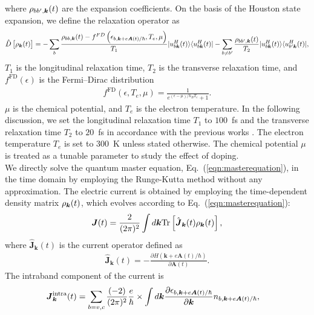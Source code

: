 where $\rho_{bb',\boldsymbol k}(t)$ are the expansion coefficients. On the basis of the Houston state expansion, we define the relaxation operator \cite{sato2019microscopic,PhysRevB.99.214302,sato2019light} as
\begin{align}
  \hat D\left [\rho_{\boldsymbol k}(t) \right ]=-\sum_{b}\frac{\rho_{bb,\boldsymbol k}(t)-f^{FD}\left (\epsilon_{b,\boldsymbol k+e\boldsymbol A(t)/\hbar},T_e,\mu \right)}{T_1}|u^H_{b\boldsymbol k}(t)\rangle \langle u^H_{b\boldsymbol k}(t)| 
  -\sum_{b\neq b'} \frac{\rho_{bb',\boldsymbol k}(t)}{T_2}|u^H_{b\boldsymbol k}(t)\rangle \langle u^H_{b'\boldsymbol k}(t)|,
\label{eqn:relaxation}
\end{align}
$T_1$ is the longitudinal relaxation time, $T_2$ is the transverse relaxation time, and $f^{\mathrm{FD}}(\epsilon)$ is the Fermi--Dirac distribution
\begin{align}
f^{\mathrm{FD}}(\epsilon, T_e, \mu)=\frac{1}{e^{(\epsilon-\mu)/k_BT_e}+1}.
\label{eq:fd-dist}
\end{align}
$\mu$ is the chemical potential, and $T_e$ is the electron temperature.
In the following discussion, we set the longitudinal relaxation time $T_1$ to $100$~fs and the transverse relaxation time $T_2$ to $20$~fs in accordance with the previous works \cite{sato2021nonlinear,sato2021high,sato2019light,sato2019microscopic}. The electron temperature $T_e$ is set to $300$~K unless stated otherwise. The chemical potential $\mu$ is treated as a tunable parameter to study the effect of doping.\\
We directly solve the quantum master equation, Eq.~(\ref{eqn:masterequation}), in the time domain by employing the Runge-Kutta method without any approximation.
The electric current is obtained by employing the time-dependent density matrix $\rho_{\boldsymbol k}(t)$, which evolves according to Eq.~(\ref{eqn:masterequation}):
\begin{eqnarray}
  \boldsymbol{J}(t)=\frac{2}{(2\pi)^2} \int d\boldsymbol k \mathrm{Tr}\left[\hat{\boldsymbol{J}}_{\boldsymbol{k}}(t)\rho_{\boldsymbol{k}}(t)\right],
\label{eqn:totalcurrent}
\end{eqnarray}
where $\hat{\boldsymbol{J}}_{\boldsymbol{k}}(t)$ is the current operator defined as
\begin{align}
\hat{\boldsymbol J}_{\boldsymbol{k}}(t) = -\frac{\partial H(\boldsymbol{k}+e\boldsymbol{A}(t)/\hbar)}{\partial \boldsymbol A(t)}.
\label{totalcurrent}
\end{align}
The intraband component of the current is
\begin{align}
\boldsymbol{J}^{\mathrm{intra}}_{\boldsymbol k}(t)&=\sum_{b=v,c} \frac{(-2)}{(2\pi)^2}
\frac{e}{\hbar} \nonumber \times  
\int d\boldsymbol{k}\frac{\partial\epsilon_{b,\boldsymbol{k}+e\boldsymbol{A}(t)/\hbar}}{\partial\boldsymbol{k}} n_{b,\boldsymbol{k}+e\boldsymbol{A}(t)/\hbar},
\label{eqn:intra-steady-current}
\end{align}
